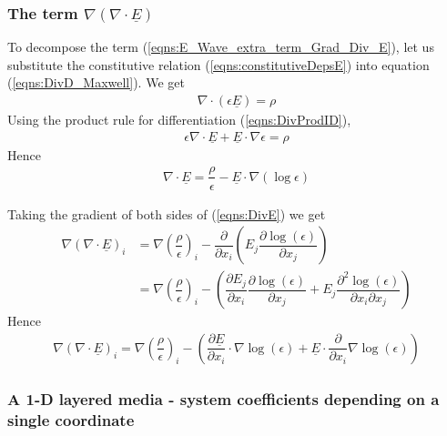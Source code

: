 \documentclass[12pt,twoside]{article}
\begin{document}
\subsubsection{The term $\nabla (\nabla \cdot \underline{E})$}
To decompose the term (\ref{eqns:E_Wave_extra_term_Grad_Div_E}), let us substitute the constitutive relation (\ref{eqns:constitutiveDepsE}) into equation (\ref{eqns:DivD_Maxwell}). We get
\begin{align*}
\nabla \cdot (\epsilon \underline{E}) = \rho
\end{align*}
Using the product rule for differentiation (\ref{eqns:DivProdID}), 
\begin{align*}
\epsilon\nabla \cdot \underline{E} + \underline{E} \cdot \nabla \epsilon = \rho
\end{align*}
Hence
\begin{align}
\label{eqns:DivE}
\nabla \cdot \underline{E} = \dfrac{\rho}{\epsilon} - \underline{E} \cdot \nabla (\log \epsilon)
\end{align}

Taking the gradient of both sides of (\ref{eqns:DivE}) we get
\begin{align*}
\nabla \left( \nabla \cdot \underline{E} \right)_i &=\nabla\left( \dfrac{\rho}{\epsilon}\right)_i-\dfrac{\partial}{\partial x_i}\left( E_j \dfrac{\partial \log(\epsilon)}{\partial x_j}\right) \\&= \nabla\left( \dfrac{\rho}{\epsilon}\right)_i - \left( \dfrac{\partial E_j}{\partial x_i}\dfrac{\partial \log(\epsilon)}{\partial x_j} + E_j \dfrac{\partial^2 \log(\epsilon)}{\partial x_i \partial x_j}\right)
\end{align*}
Hence
\begin{align}
\label{eqns:E_Wave_extra_term_Grad_Div_E_expanded}
\nabla \left( \nabla \cdot \underline{E} \right)_i = \nabla\left( \dfrac{\rho}{\epsilon}\right)_i - \left(\dfrac{\partial \underline{E}}{\partial x_i} \cdot \nabla \log(\epsilon) + \underline{E} \cdot \dfrac{\partial}{\partial x_i} \nabla \log(\epsilon) \right)
\end{align}

\subsubsection{A 1-D layered media - system coefficients depending on a single coordinate}
\end{document}
